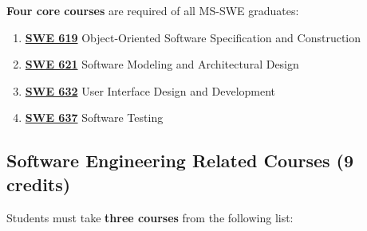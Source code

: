 \documentclass[oneside,11pt]{memoir}
\begin{document}
\textbf{Four core courses} are required of all MS-SWE graduates:

\begin{enumerate}
    \item \href{https://catalog.gmu.edu/search/?P=SWE%20619}{\textbf{SWE 619}} Object-Oriented Software Specification and Construction
    \item \href{https://catalog.gmu.edu/search/?P=SWE%20621}{\textbf{SWE 621}} Software Modeling and Architectural Design
    \item \href{https://catalog.gmu.edu/search/?P=SWE%20632}{\textbf{SWE 632}} User Interface Design and Development
    \item \href{https://catalog.gmu.edu/search/?P=SWE%20637}{\textbf{SWE 637}} Software Testing
\end{enumerate}

\subsection{Software Engineering Related Courses (9 credits)}

Students must take \textbf{three courses} from the following list:
\end{document}
